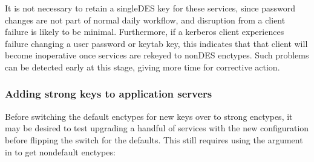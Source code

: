 \documentclass[letterpaper,10pt,english]{sphinxmanual}
\begin{document}
\begin{sphinxVerbatim}[commandchars=\\\{\}]
\PYG{p}{[} \PYG{p}{]}
 
\PYG{p}{[} \PYG{p}{]}
 
     
   
\PYG{p}{[} \PYG{p}{]}
 
     
   
\end{sphinxVerbatim}

\sphinxAtStartPar
It is not necessary to retain a single\sphinxhyphen{}DES key for these services, since
password changes are not part of normal daily workflow, and disruption
from a client failure is likely to be minimal.  Furthermore, if a kerberos
client experiences failure changing a user password or keytab key,
this indicates that that client will become inoperative once services
are rekeyed to non\sphinxhyphen{}DES enctypes.  Such problems can be detected early
at this stage, giving more time for corrective action.


\subsubsection{Adding strong keys to application servers}
\label{\detokenize{admin/advanced/retiring-des:adding-strong-keys-to-application-servers}}
\sphinxAtStartPar
Before switching the default enctypes for new keys over to strong enctypes,
it may be desired to test upgrading a handful of services with the
new configuration before flipping the switch for the defaults.  This
still requires using the  argument in {\hyperref[\detokenize{admin/admin_commands/kadmin_local:kadmin-1}]{}} to get non\sphinxhyphen{}default
enctypes:
\end{document}
